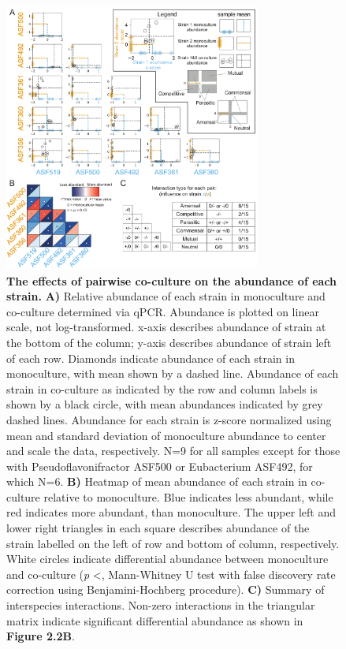 \documentclass[11pt,onecolumn,notitlepage,openany,twoside]{book}
\begin{document}
\begin{refsection}
\begin{figure}
\centering
\includegraphics[width=0.75\textwidth]{ch2_fig2}
\caption[The effects of pairwise co-culture on the abundance of each strain.]{\textbf{The effects of pairwise co-culture on the abundance of each strain.} \textbf{A)} Relative abundance of each strain in monoculture and co-culture determined via qPCR. Abundance is plotted on linear scale, not log-transformed. x-axis describes abundance of strain at the bottom of the column; y-axis describes abundance of strain left of each row. Diamonds indicate abundance of each strain in monoculture, with mean shown by a dashed line. Abundance of each strain in co-culture as indicated by the row and column labels is shown by a black circle, with mean abundances indicated by grey dashed lines. Abundance for each strain is z-score normalized using mean and standard deviation of monoculture abundance to center and scale the data, respectively. N=9 for all samples except for those with Pseudoflavonifractor ASF500 or Eubacterium ASF492, for which N=6. \textbf{B)} Heatmap of mean abundance of each strain in co-culture relative to monoculture. Blue indicates less abundant, while red indicates more abundant, than monoculture. The upper left and lower right triangles in each square describes abundance of the strain labelled on the left of row and bottom of column, respectively. White circles indicate differential abundance between monoculture and co-culture (\textit{p} \textless{}, Mann-Whitney U test with false discovery rate correction using Benjamini-Hochberg procedure). \textbf{C)} Summary of interspecies interactions. Non-zero interactions in the triangular matrix indicate significant differential abundance as shown in \textbf{Figure 2.2B}.}
\end{figure}


\end{refsection}
\end{document}
